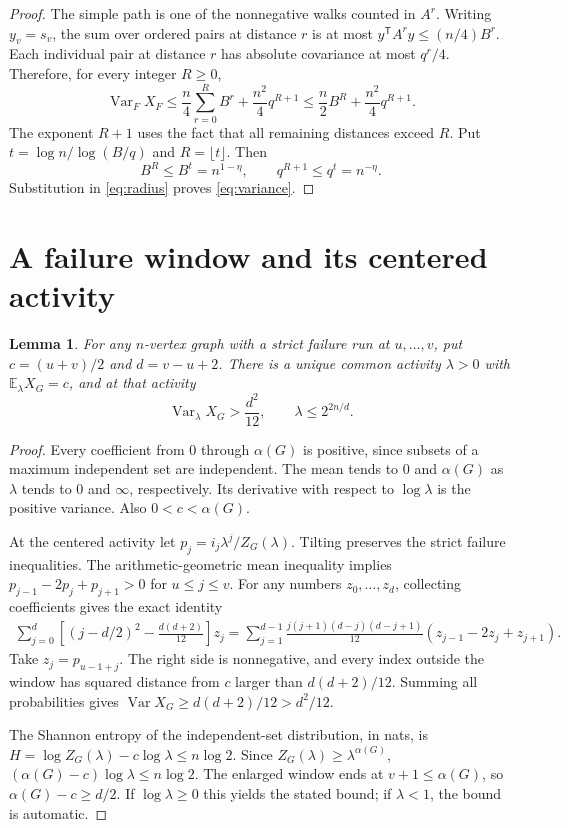 \documentclass[10pt]{article}
\newtheorem{lemma}[theorem]{Lemma}
\newcommand{\Var}{\operatorname{Var}}
\begin{document}
\begin{proof}
The simple path is one of the nonnegative walks counted in \(A^r\).
Writing \(y_v=s_v\), the sum over ordered pairs at distance \(r\) is
at most \(y^\mathsf T A^r y\le(n/4)B^r\). Each individual pair at
distance \(r\) has absolute covariance at most \(q^r/4\). Therefore,
for every integer \(R\ge0\),
\begin{equation}\label{eq:radius}
 \Var_F X_F\le \frac n4\sum_{r=0}^R B^r+
                      \frac{n^2}4q^{R+1}
 \le\frac n2 B^R+\frac{n^2}4q^{R+1}.
\end{equation}
The exponent \(R+1\) uses the fact that all remaining distances exceed
\(R\). Put \(t=\log n/\log(B/q)\) and \(R=\lfloor t\rfloor\).
Then
\[
 B^R\le B^t=n^{1-\eta},\qquad q^{R+1}\le q^t=n^{-\eta}.
\]
Substitution in \eqref{eq:radius} proves \eqref{eq:variance}.
\end{proof}

\section{A failure window and its centered activity}
\begin{lemma}\label{lem:window}
For any \(n\)-vertex graph with a strict failure run at \(u,\ldots,v\),
put \(c=(u+v)/2\) and \(d=v-u+2\). There is a unique common activity
\(\lambda>0\) with \(\mathbb E_\lambda X_G=c\), and at that activity
\begin{equation}\label{eq:window}
 \Var_\lambda X_G>\frac{d^2}{12},\qquad
 \lambda\le 2^{2n/d}.
\end{equation}
\end{lemma}
\begin{proof}
Every coefficient from \(0\) through \(\alpha(G)\) is positive, since
subsets of a maximum independent set are independent. The mean tends
to \(0\) and \(\alpha(G)\) as \(\lambda\) tends to \(0\) and
\(\infty\), respectively. Its derivative with respect to \(\log\lambda\)
is the positive variance. Also \(0<c<\alpha(G)\).

At the centered activity let \(p_j=i_j\lambda^j/Z_G(\lambda)\).
Tilting preserves the strict failure inequalities. The arithmetic-geometric
mean inequality implies \(p_{j-1}-2p_j+p_{j+1}>0\) for
\(u\le j\le v\). For any numbers \(z_0,\ldots,z_d\), collecting
coefficients gives the exact identity
\begin{align*}
 \sum_{j=0}^{d}\left[(j-d/2)^2-\frac{d(d+2)}{12}\right]z_j
 =\sum_{j=1}^{d-1}
 \frac{j(j+1)(d-j)(d-j+1)}{12}
                  (z_{j-1}-2z_j+z_{j+1}).
\end{align*}
Take \(z_j=p_{u-1+j}\). The right side is nonnegative, and every index
outside the window has squared distance from \(c\) larger than
\(d(d+2)/12\). Summing all probabilities gives
\(\Var X_G\ge d(d+2)/12>d^2/12\).

The Shannon entropy of the independent-set distribution, in nats, is
\(H=\log Z_G(\lambda)-c\log\lambda\le n\log2\).
Since \(Z_G(\lambda)\ge\lambda^{\alpha(G)}\),
\((\alpha(G)-c)\log\lambda\le n\log2\).
The enlarged window ends at \(v+1\le\alpha(G)\), so
\(\alpha(G)-c\ge d/2\). If \(\log\lambda\ge0\) this yields the stated
bound; if \(\lambda<1\), the bound is automatic.
\end{proof}
\end{document}
